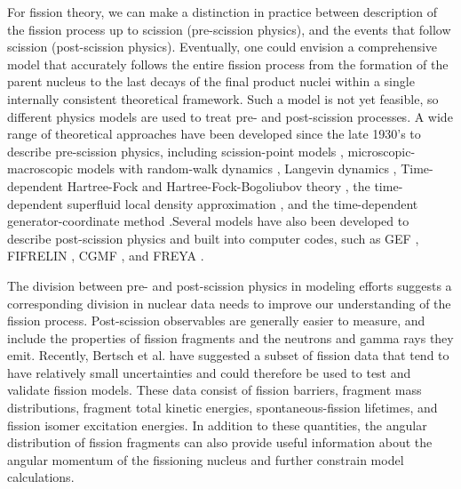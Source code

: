 \documentclass[letterpaper]{ar-1col}
\begin{document}
For fission theory, we can make a distinction in practice between description of the fission process up to scission (pre-scission physics), and the events that follow scission (post-scission physics).
Eventually, one could envision a comprehensive model that accurately follows the entire fission process from the formation of the parent nucleus to the last decays of the final product nuclei within a single internally consistent theoretical framework.
Such a model is not yet feasible, so different physics models are used to treat pre- and post-scission processes.
A wide range of theoretical approaches have been developed since the late 1930's to describe pre-scission physics, including scission-point models \cite{Wil76,Lem15}, microscopic-macroscopic models \cite{Mol15} with random-walk dynamics \cite{War17}, Langevin dynamics \cite{Sie17}, Time-dependent Hartree-Fock and Hartree-Fock-Bogoliubov theory \cite{Koo76,Neg78,Tan15,God16}, the time-dependent superfluid local density approximation \cite{Ste11,Bul13,Ste15,Bul16}, and the time-dependent generator-coordinate method \cite{Ber91,Gou05,Rei16}.Several models have also been developed to describe post-scission physics and built into computer codes, such as GEF \cite{Schm16}, FIFRELIN \cite{Lit15}, CGMF \cite{Tal14}, and FREYA \cite{Ran09,Ver18}.

The division between pre- and post-scission physics in modeling efforts suggests a corresponding division in nuclear data needs to improve our understanding of the fission process.
Post-scission observables are generally easier to measure, and include the properties of fission fragments and the neutrons and gamma rays they emit.
 Recently, Bertsch et al. \cite{Ber15} have suggested a subset of fission data that tend to have relatively small uncertainties and could therefore be used to test and validate fission models.
These data consist of fission barriers, fragment mass distributions, fragment total kinetic energies, spontaneous-fission lifetimes, and fission isomer excitation energies.
In addition to these quantities, the angular distribution of fission fragments can also provide useful information about the angular momentum of the fissioning nucleus and further constrain model calculations.
\end{document}
